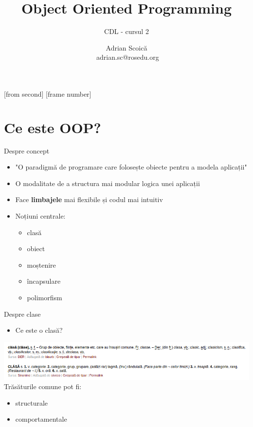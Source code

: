 \documentclass{beamer}
\title[Object Oriented Programming]{Object Oriented Programming}
\subtitle{CDL - cursul 2}
\institute{ROSEdu}
\author{Adrian Scoică\\\,\,{adrian.sc@rosedu.org}}
\begin{document}
[from second]
[frame number]

\frame{\titlepage}

\frame{\tableofcontents}

\section{Ce este OOP?}
    \frame{\tableofcontents[currentsection]}
    
    \begin{frame}{Despre concept}
    \begin{itemize}
    \setlength{\itemsep}{0.8cm}
    \item "O paradigmă de programare care folosește obiecte pentru a modela aplicații" \pause
    \item O modalitate de a structura mai modular logica unei aplicații \pause
    \item Face {\bf limbajele} mai flexibile și codul mai intuitiv \pause
    \item Noțiuni centrale: \pause
    	\begin{itemize}
    	\item clasă \pause
    	\item obiect \pause
    	\item moștenire \pause
    	\item încapsulare \pause
    	\item polimorfism \pause
    	\end{itemize}
    \end{itemize}
    \end{frame}

    \begin{frame}{Despre clase}
    \begin{itemize}
    \setlength{\itemsep}{0.4cm}
    \item Ce este o clasă? \pause
    \end{itemize}
    \includegraphics[scale=0.4]{Clasa.png}\\
    \pause Trăsăturile comune pot fi: \pause
	\begin{itemize} 
    \item structurale \pause 
    \item comportamentale 
    \end{itemize}
    \end{frame}
\end{document}
